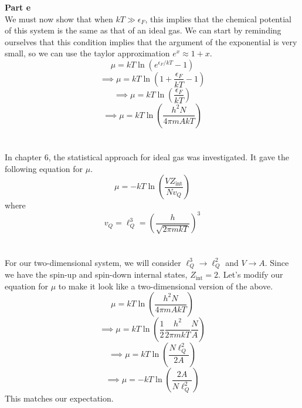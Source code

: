 \documentclass[12pt]{article}
\begin{document}
\begin{flushleft}
\textbf{Part e}\\
We must now show that when $kT\gg\epsilon_F$, this implies that the chemical potential of this system is the same as that of an ideal gas.
We can start by reminding ourselves that this condition implies that the argument of the exponential is very small, so we can use the taylor approximation $e^x\approx1+x$.
$$\mu=kT\ln\left(e^{\epsilon_F/kT}-1\right)$$
$$\implies \mu=kT\ln\left(1+\frac{\epsilon_F}{kT}-1\right)$$
$$\implies \mu=kT\ln\left(\frac{\epsilon_F}{kT}\right)$$
$$\implies \mu=kT\ln\left(\frac{h^2N}{4\pi mAkT}\right)$$\\~\\

In chapter 6, the statistical approach for ideal gas was investigated.
It gave the following equation for $\mu$.
\begin{equation}
    \mu=-kT\ln\left(\frac{VZ_\text{int}}{Nv_Q}\right)
\end{equation}
where
\begin{equation}
    v_Q=\ell_Q^3=\left(\frac{h}{\sqrt{2\pi mkT}}\right)^3
\end{equation}\\~\\

For our two-dimensional system, we will consider $\ell_Q^3\rightarrow\ell_Q^2$ and $V\rightarrow A$.
Since we have the spin-up and spin-down internal states, $Z_\text{int}=2$.
Let's modify our equation for $\mu$ to make it look like a two-dimensional version of the above.
$$\mu=kT\ln\left(\frac{h^2N}{4\pi mAkT}\right)$$
$$\implies \mu=kT\ln\left(\frac{1}{2}\frac{h^2}{2\pi mkT}\frac{N}{A}\right)$$
$$\implies \mu=kT\ln\left(\frac{N\ell_Q^2}{2A}\right)$$
$$\implies \mu=-kT\ln\left(\frac{2A}{N\ell_Q^2}\right)$$
This matches our expectation.





\end{flushleft}
\end{document}
